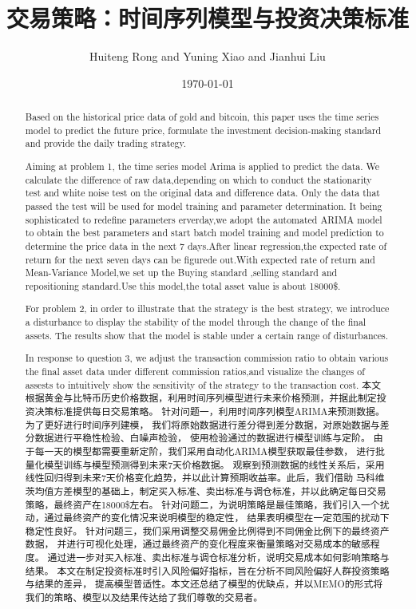 \documentclass{mcmthesis}
\title{交易策略：时间序列模型与投资决策标准}
\author{\small Huiteng Rong and Yuning Xiao and Jianhui Liu}
\date{\today}
\begin{document}
\begin{abstract}
Based on the historical price data of gold and bitcoin, this paper uses the time series model to 
predict the future price, formulate the investment decision-making standard and provide the daily trading strategy.

Aiming at problem 1, the time series model Arima is applied to predict the data.
We calculate the difference of raw data,depending on which to 
 conduct the stationarity test and white noise test on the original data and difference data.
 Only the data that passed the test will be used for model training and parameter determination.
 It being sophisticated to redefine parameters erverday,we adopt the automated ARIMA model to obtain the best parameters 
 and start batch model training and model prediction to determine the price data in the next 7 days.After
 linear regression,the expected rate of return for the next seven days can be figurede out.With expected rate of return and 
 Mean-Variance Model,we set up the Buying standard ,selling standard and repositioning standard.Use this model,the total
 asset value is about 18000\$.

 For problem 2, in order to illustrate that the strategy is the best strategy,
  we introduce a disturbance to display the stability of the model through the change of the final assets. 
  The results show that the model is stable under a certain range of disturbances.
  
  In response to question 3, we adjust the transaction commission ratio to obtain various
  the final asset data under different commission ratios,and visualize the changes of assests to 
  intuitively show the sensitivity of the strategy to the transaction cost.
本文根据黄金与比特币历史价格数据，利用时间序列模型进行未来价格预测，并据此制定投资决策标准提供每日交易策略。
针对问题一，利用时间序列模型ARIMA来预测数据。为了更好进行时间序列建模，
我们将原始数据进行差分得到差分数据，对原始数据与差分数据进行平稳性检验、白噪声检验，
使用检验通过的数据进行模型训练与定阶。
由于每一天的模型都需要重新定阶，我们采用自动化ARIMA模型获取最佳参数，
进行批量化模型训练与模型预测得到未来7天价格数据。
观察到预测数据的线性关系后，采用线性回归得到未来7天价格变化趋势，并以此计算预期收益率。此后，我们借助
马科维茨均值方差模型的基础上，制定买入标准、卖出标准与调仓标准，并以此确定每日交易策略，最终资产在18000\$左右。
针对问题二，为说明策略是最佳策略，我们引入一个扰动，通过最终资产的变化情况来说明模型的稳定性，
结果表明模型在一定范围的扰动下稳定性良好。
针对问题三，我们采用调整交易佣金比例得到不同佣金比例下的最终资产数据，
并进行可视化处理，通过最终资产的变化程度来衡量策略对交易成本的敏感程度。
通过进一步对买入标准、卖出标准与调仓标准分析，说明交易成本如何影响策略与结果。
本文在制定投资标准时引入风险偏好指标，旨在分析不同风险偏好人群投资策略与结果的差异，
提高模型普适性。本文还总结了模型的优缺点，并以MEMO的形式将我们的策略、模型以及结果传达给了我们尊敬的交易者。


\end{abstract}
\end{document}
